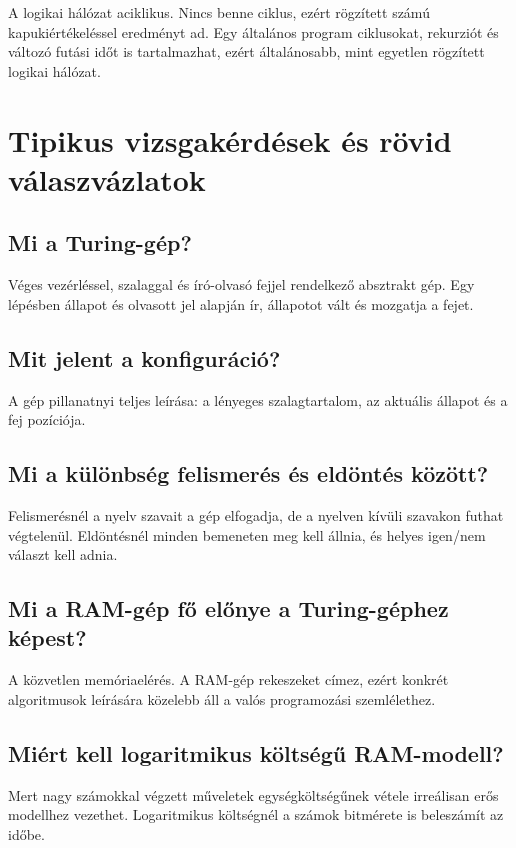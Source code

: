A logikai hálózat aciklikus. Nincs benne ciklus, ezért rögzített számú kapukiértékeléssel eredményt ad. Egy általános program ciklusokat, rekurziót és változó futási időt is tartalmazhat, ezért általánosabb, mint egyetlen rögzített logikai hálózat.

\section{Tipikus vizsgakérdések és rövid válaszvázlatok}

\subsection{Mi a Turing-gép?}

Véges vezérléssel, szalaggal és író-olvasó fejjel rendelkező absztrakt gép. Egy lépésben állapot és olvasott jel alapján ír, állapotot vált és mozgatja a fejet.

\subsection{Mit jelent a konfiguráció?}

A gép pillanatnyi teljes leírása: a lényeges szalagtartalom, az aktuális állapot és a fej pozíciója.

\subsection{Mi a különbség felismerés és eldöntés között?}

Felismerésnél a nyelv szavait a gép elfogadja, de a nyelven kívüli szavakon futhat végtelenül. Eldöntésnél minden bemeneten meg kell állnia, és helyes igen/nem választ kell adnia.

\subsection{Mi a RAM-gép fő előnye a Turing-géphez képest?}

A közvetlen memóriaelérés. A RAM-gép rekeszeket címez, ezért konkrét algoritmusok leírására közelebb áll a valós programozási szemlélethez.

\subsection{Miért kell logaritmikus költségű RAM-modell?}

Mert nagy számokkal végzett műveletek egységköltségűnek vétele irreálisan erős modellhez vezethet. Logaritmikus költségnél a számok bitmérete is beleszámít az időbe.

